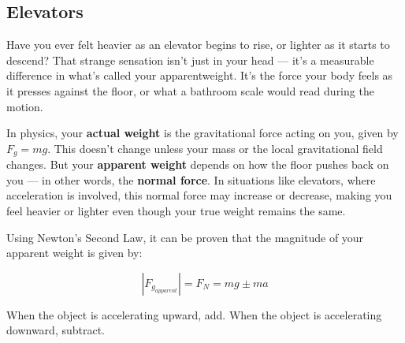 		
		
		
		\subsection{Elevators}
		Have you ever felt heavier as an elevator begins to rise, or lighter as it starts to descend? That strange sensation isn’t just in your head — it’s a measurable difference in what’s called your \gls{apparentweight}. It’s the force your body feels as it presses against the floor, or what a bathroom scale would read during the motion.
		
		In physics, your \textbf{actual weight} is the gravitational force acting on you, given by \( F_g = mg \). This doesn't change unless your mass or the local gravitational field changes. But your \textbf{apparent weight} depends on how the floor pushes back on you — in other words, the \textbf{normal force}. In situations like elevators, where acceleration is involved, this normal force may increase or decrease, making you feel heavier or lighter even though your true weight remains the same.
		
		Using Newton's Second Law, it can be proven that the magnitude of your apparent weight is given by:
			\begin{mdframed}[backgroundcolor=orange!20!white]
			\begin{equation}
				|F_{g_{apparent}}| = F_N = mg \pm ma
				\label{eqn:apparentweight}
			\end{equation}
		\end{mdframed}
		When the object is accelerating upward, add.  When the object is accelerating downward, subtract. 
		
		
		
